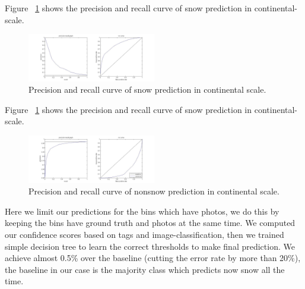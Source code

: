 \documentclass[10pt,journal,compsoc]{IEEEtran}
\begin{document}
Figure ~\ref{fig:snowcurve} shows the precision and recall curve of snow prediction in continental-scale.
\begin{figure}
\begin{center}

\includegraphics[width=0.5\textwidth]{snowcurve.jpg}


\end{center}
\vspace{-24pt}
\caption{Precision and recall curve of snow prediction in continental scale.}
\label{fig:snowcurve}
\vspace{-12pt}
\end{figure}
Figure ~\ref{fig:snowcurve} shows the precision and recall curve of snow prediction in continental-scale.
\begin{figure}
\begin{center}

\includegraphics[width=0.5\textwidth]{nonsnowcurve.jpg}


\end{center}
\vspace{-24pt}
\caption{Precision and recall curve of nonsnow prediction in continental scale.}
\label{fig:nonsnowcurve}
\vspace{-12pt}
\end{figure}
Here we limit our predictions for the bins which have photos, we do this by keeping the bins have ground truth and photos at the same time. 
We computed our confidence scores based on tags and image-classification, then we trained simple decision tree to learn the correct thresholds to make final prediction. We achieve almost 0.5\% over the baseline (cutting the error rate by more than 20\%), the baseline in our case is the majority class which predicts now snow all the time.  
  
\end{document}
